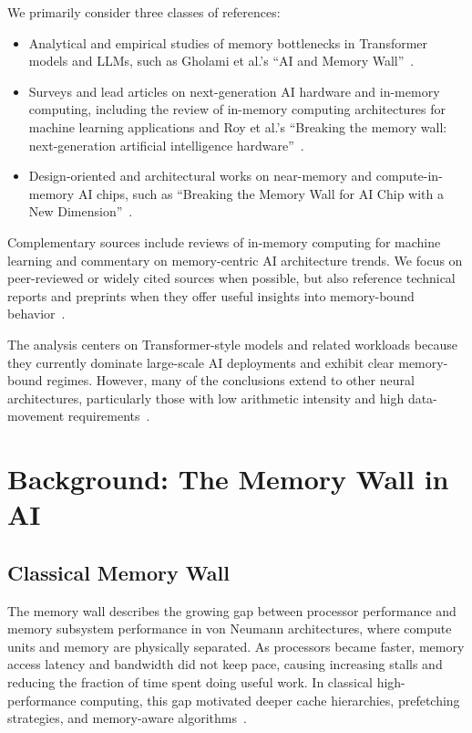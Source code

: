 \documentclass[conference]{IEEEtran}
\begin{document}
We primarily consider three classes of references:
\begin{itemize}
    \item Analytical and empirical studies of memory bottlenecks in Transformer models and LLMs, such as Gholami et al.'s ``AI and Memory Wall''~\cite{gholami2024ai}.
    \item Surveys and lead articles on next-generation AI hardware and in-memory computing, including the review of in-memory computing architectures for machine learning applications and Roy et al.'s ``Breaking the memory wall: next-generation artificial intelligence hardware''~\cite{bavikadi2020review,roy2025breaking}.
    \item Design-oriented and architectural works on near-memory and compute-in-memory AI chips, such as ``Breaking the Memory Wall for AI Chip with a New Dimension''~\cite{sunrise2020}.
\end{itemize}

Complementary sources include reviews of in-memory computing for machine learning and commentary on memory-centric AI architecture trends. We focus on peer-reviewed or widely cited sources when possible, but also reference technical reports and preprints when they offer useful insights into memory-bound behavior~\cite{snasel2024review,mittal2021survey,heterogeneous2021,memorycompilers2026}.

The analysis centers on Transformer-style models and related workloads because they currently dominate large-scale AI deployments and exhibit clear memory-bound regimes. However, many of the conclusions extend to other neural architectures, particularly those with low arithmetic intensity and high data-movement requirements~\cite{bavikadi2020review,roy2025breaking,gholami2024ai}.

\section{Background: The Memory Wall in AI}
\label{sec:background}

\subsection{Classical Memory Wall}

The memory wall describes the growing gap between processor performance and memory subsystem performance in von Neumann architectures, where compute units and memory are physically separated. As processors became faster, memory access latency and bandwidth did not keep pace, causing increasing stalls and reducing the fraction of time spent doing useful work. In classical high-performance computing, this gap motivated deeper cache hierarchies, prefetching strategies, and memory-aware algorithms~\cite{roy2025breaking}.
\end{document}
